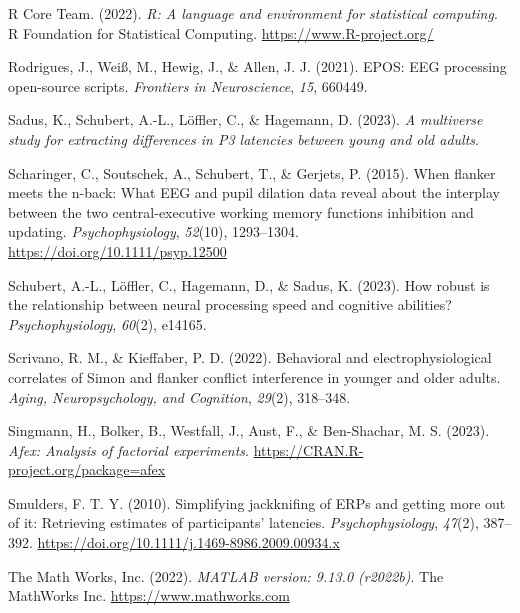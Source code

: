\documentclass[
  man]{apa7}
\newlength{\cslhangindent}
\newlength{\cslentryspacingunit} %
\newenvironment{CSLReferences}[2] %
 {%
  \setlength{\parindent}{0pt}
  \ifodd #1
  \let\oldpar\par
  \def\par{\hangindent=\cslhangindent\oldpar}
  \fi
  \setlength{\parskip}{#2\cslentryspacingunit}
 }%
 {}
\begin{document}
\begin{CSLReferences}{1}{0}
\leavevmode{}%
R Core Team. (2022). \emph{R: A language and environment for statistical computing}. R Foundation for Statistical Computing. \url{https://www.R-project.org/}

\leavevmode{}%
Rodrigues, J., Weiß, M., Hewig, J., \& Allen, J. J. (2021). {EPOS}: {EEG} processing open-source scripts. \emph{Frontiers in Neuroscience}, \emph{15}, 660449.

\leavevmode{}%
Sadus, K., Schubert, A.-L., Löffler, C., \& Hagemann, D. (2023). \emph{A multiverse study for extracting differences in {P3} latencies between young and old adults}.

\leavevmode{}%
Scharinger, C., Soutschek, A., Schubert, T., \& Gerjets, P. (2015). When flanker meets the n-back: {What} {EEG} and pupil dilation data reveal about the interplay between the two central-executive working memory functions inhibition and updating. \emph{Psychophysiology}, \emph{52}(10), 1293--1304. \url{https://doi.org/10.1111/psyp.12500}

\leavevmode{}%
Schubert, A.-L., Löffler, C., Hagemann, D., \& Sadus, K. (2023). How robust is the relationship between neural processing speed and cognitive abilities? \emph{Psychophysiology}, \emph{60}(2), e14165.

\leavevmode{}%
Scrivano, R. M., \& Kieffaber, P. D. (2022). Behavioral and electrophysiological correlates of {Simon} and flanker conflict interference in younger and older adults. \emph{Aging, Neuropsychology, and Cognition}, \emph{29}(2), 318--348.

\leavevmode{}%
Singmann, H., Bolker, B., Westfall, J., Aust, F., \& Ben-Shachar, M. S. (2023). \emph{Afex: Analysis of factorial experiments}. \url{https://CRAN.R-project.org/package=afex}

\leavevmode{}%
Smulders, F. T. Y. (2010). Simplifying jackknifing of {ERPs} and getting more out of it: {Retrieving} estimates of participants' latencies. \emph{Psychophysiology}, \emph{47}(2), 387--392. \url{https://doi.org/10.1111/j.1469-8986.2009.00934.x}

\leavevmode{}%
The Math Works, Inc. (2022). \emph{{MATLAB} version: 9.13.0 (r2022b)}. The MathWorks Inc. \url{https://www.mathworks.com}


\end{CSLReferences}
\end{document}
